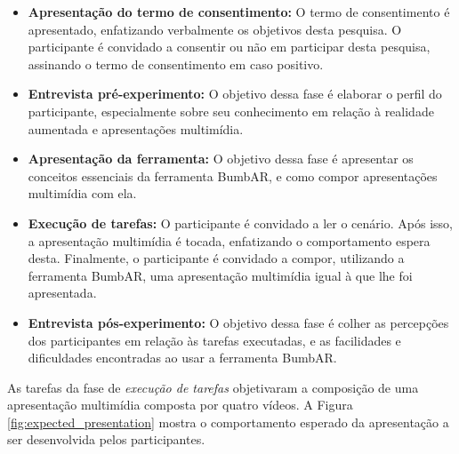 \documentclass[../main.tex]{subfiles}
\begin{document}
\begin{itemize}
    \item \textbf{Apresentação do termo de consentimento:} O termo de consentimento é apresentado, enfatizando verbalmente os objetivos desta pesquisa. O participante é convidado a consentir ou não em participar desta pesquisa, assinando o termo de consentimento em caso positivo.
    \item \textbf{Entrevista pré-experimento:} O objetivo dessa fase é elaborar o perfil do participante, especialmente sobre seu conhecimento em relação à realidade aumentada e apresentações multimídia.
    \item \textbf{Apresentação da ferramenta:} O objetivo dessa fase é apresentar os conceitos essenciais da ferramenta BumbAR, e como compor apresentações multimídia com ela.
    \item \textbf{Execução de tarefas:} O participante é convidado a ler o cenário. Após isso, a apresentação multimídia é tocada, enfatizando o comportamento espera desta. Finalmente, o participante é convidado a compor, utilizando a ferramenta BumbAR, uma apresentação multimídia igual à que lhe foi apresentada.
    \item \textbf{Entrevista pós-experimento:} O objetivo dessa fase é colher as percepções dos participantes em relação às tarefas executadas, e as facilidades e dificuldades encontradas ao usar a ferramenta BumbAR.
\end{itemize}

As tarefas da fase de \emph{execução de tarefas} objetivaram a composição de uma apresentação multimídia composta por quatro vídeos. A Figura \ref{fig:expected_presentation} mostra o comportamento esperado da apresentação a ser desenvolvida pelos participantes.
\end{document}
